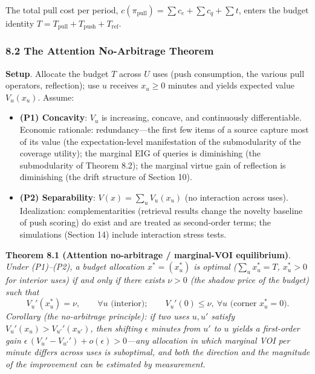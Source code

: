 \documentclass[
  11pt]{article}
\providecommand{\tightlist}{%
  \setlength{\itemsep}{0pt}\setlength{\parskip}{0pt}}
\begin{document}
The total pull cost per period,
\(c(\pi_{\mathrm{pull}}) = \sum c_e + \sum c_q + \sum t\), enters the
budget identity
\(T = T_{\mathrm{pull}} + T_{\mathrm{push}} + T_{\mathrm{ref}}\).

\subsubsection{8.2 The Attention No-Arbitrage
Theorem}\label{the-attention-no-arbitrage-theorem}

\textbf{Setup}. Allocate the budget \(T\) across \(U\) uses (push
consumption, the various pull operators, reflection); use \(u\) receives
\(x_u \ge 0\) minutes and yields expected value \(V_u(x_u)\). Assume:

\begin{itemize}
\tightlist
\item
  \textbf{(P1) Concavity}: \(V_u\) is increasing, concave, and
  continuously differentiable. Economic rationale: redundancy---the
  first few items of a source capture most of its value (the
  expectation-level manifestation of the submodularity of the coverage
  utility); the marginal EIG of queries is diminishing (the
  submodularity of Theorem 8.2); the marginal virtue gain of reflection
  is diminishing (the drift structure of Section 10).
\item
  \textbf{(P2) Separability}: \(V(x) = \sum_u V_u(x_u)\) (no interaction
  across uses). Idealization: complementarities (retrieval results
  change the novelty baseline of push scoring) do exist and are treated
  as second-order terms; the simulations (Section 14) include
  interaction stress tests.
\end{itemize}

\textbf{Theorem 8.1 (Attention no-arbitrage / marginal-VOI
equilibrium)}. \emph{Under (P1)--(P2), a budget allocation
\(x^* = (x_u^*)\) is optimal (\(\sum_u x_u^* = T\), \(x_u^* > 0\) for
interior uses) if and only if there exists \(\nu > 0\) (the shadow price
of the budget) such that}
\[V_u'(x_u^*) = \nu, \qquad \forall u \text{ (interior)}; \qquad V_u'(0) \le \nu, \ \forall u \text{ (corner } x_u^* = 0\text{)}.\]
\emph{Corollary (the no-arbitrage principle): if two uses \(u, u'\)
satisfy \(V_u'(x_u) > V_{u'}'(x_{u'})\), then shifting \(\epsilon\)
minutes from \(u'\) to \(u\) yields a first-order gain
\(\epsilon\,(V_u' - V_{u'}') + o(\epsilon) > 0\)---any allocation in
which marginal VOI per minute differs across uses is suboptimal, and
both the direction and the magnitude of the improvement can be estimated
by measurement.}
\end{document}
